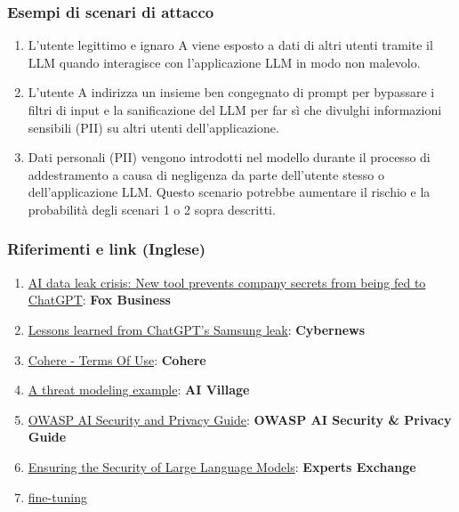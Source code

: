 \documentclass[
]{article}
\providecommand{\tightlist}{%
  \setlength{\itemsep}{0pt}\setlength{\parskip}{0pt}}
\begin{document}
\subsubsection{Esempi di scenari di
attacco}\label{esempi-di-scenari-di-attacco}

\begin{enumerate}
\def\labelenumi{\arabic{enumi}.}
\tightlist
\item
  L'utente legittimo e ignaro A viene esposto a dati di altri utenti
  tramite il LLM quando interagisce con l'applicazione LLM in modo non
  malevolo.
\item
  L'utente A indirizza un insieme ben congegnato di prompt per bypassare
  i filtri di input e la sanificazione del LLM per far sì che divulghi
  informazioni sensibili (PII) su altri utenti dell'applicazione.
\item
  Dati personali (PII) vengono introdotti nel modello durante il
  processo di addestramento a causa di negligenza da parte dell'utente
  stesso o dell'applicazione LLM. Questo scenario potrebbe aumentare il
  rischio e la probabilità degli scenari 1 o 2 sopra descritti.
\end{enumerate}

\subsubsection{Riferimenti e link
(Inglese)}\label{riferimenti-e-link-inglese}

\begin{enumerate}
\def\labelenumi{\arabic{enumi}.}
\tightlist
\item
  \href{https://www.foxbusiness.com/politics/ai-data-leak-crisis-prevent-company-secrets-chatgpt}{AI
  data leak crisis: New tool prevents company secrets from being fed to
  ChatGPT}: \textbf{Fox Business}
\item
  \href{https://cybernews.com/security/chatgpt-samsung-leak-explained-lessons/}{Lessons
  learned from ChatGPT's Samsung leak}: \textbf{Cybernews}
\item
  \href{https://cohere.com/terms-of-use}{Cohere - Terms Of Use}:
  \textbf{Cohere}
\item
  \href{https://aivillage.org/large\%20language\%20models/threat-modeling-llm/}{A
  threat modeling example}: \textbf{AI Village}
\item
  \href{https://owasp.org/www-project-ai-security-and-privacy-guide/}{OWASP
  AI Security and Privacy Guide}: \textbf{OWASP AI Security \& Privacy
  Guide}
\item
  \href{https://www.experts-exchange.com/articles/38220/Ensuring-the-Security-of-Large-Language-Models-Strategies-and-Best-Practices.html}{Ensuring
  the Security of Large Language Models}: \textbf{Experts Exchange}
\item
  \href{https://github.com/OWASP/www-project-top-10-for-large-language-model-applications/wiki/Definitions}{fine-tuning}
\end{enumerate}
\end{document}
